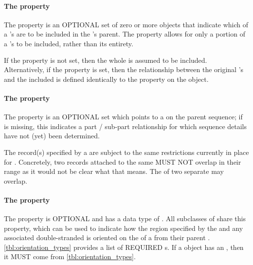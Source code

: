 \paragraph{The  property}\label{sec:sourceLocations}

The  property is an OPTIONAL set of zero or more  objects that indicate which  of a 's  are to be included in the 's parent. The  property
allows for only a portion of a 's  to be included, rather than its entirety.

If the  property is not set, then the whole  is assumed to be included. Alternatively,
if the  property is set, then the relationship between the original 's
 and the included  is defined identically to the 
property on the  object.

\paragraph{The  property}\label{sec:location}
The  property is an OPTIONAL set which points to a  on the parent  sequence; if  is missing, this indicates a part / sub-part relationship for which sequence details have not (yet) been determined.

The  record(s) specified by a  are subject to the same restrictions currently in place for  . Concretely, two  records attached to the same  MUST NOT overlap in their range as it would not be clear what that means. The  of two separate  may overlap.

\paragraph{The  property}\label{sec:orientation2}
The  property is OPTIONAL and has a data type of . All subclasses of  share this property, which can be used to indicate how the region specified by the  and any associated double-stranded  is oriented on the  of a   from their parent . \ref{tbl:orientation_types} provides a list of REQUIRED  s. If a  object has an , then it MUST come from \ref{tbl:orientation_types}.

